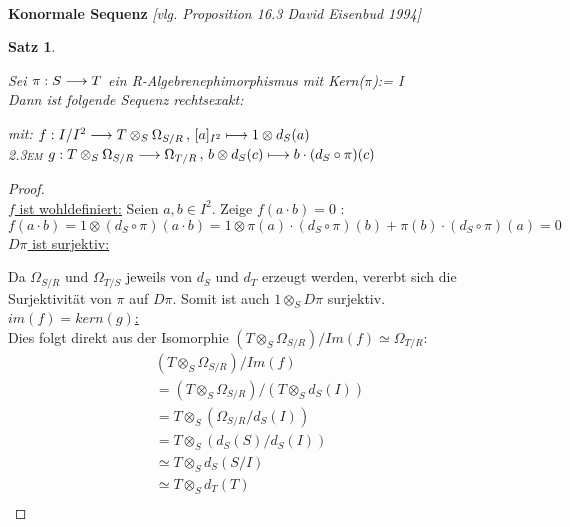 \documentclass[10pt,a4paper]{report}
\newcommand{\ModulsOfDifferenzials}{David Eisenbud 1994}
\newcounter{Aussage}[chapter]
\newtheorem{satz}[Aussage]{Satz}
\newcommand{\functionfront}[3]{\nolinebreak{#1:#2 \longrightarrow #3}}
\newcommand{\function}[5]{\nolinebreak{#1:#2 \longrightarrow #3 \, , \, #4 \longmapsto #5}}
\newcommand{\divR}[2]{\Omega_{#1/#2}}
\newcommand{\divf}[1]{d_{#1}}
\newcommand{\Tensor}[3]{#1 \otimes_{#2} #3}
\newcommand{\tensor}[3]{#1 \otimes #3}
\newcommand{\kernel}[1]{kern(#1)}
\newcommand{\immage}[1]{im(#1)}
\begin{document}
\ \\
\textbf{Konormale Sequenz} \textit{[vlg. Proposition 16.3 \ModulsOfDifferenzials]}
\begin{satz} \label{Konormale Sequenz}
\raggedright
Sei $\functionfront{\pi}{S}{T}$ ein R-Algebrenephimorphismus mit Kern($\pi$):= I \\
Dann ist folgende Sequenz rechtsexakt: \\
\begin{center}
\end{center}
\begin{spacing}{1.5}
mit: $\function{f}{I/I^2}{{\Tensor{T}{S}{\divR{S}{R}}}}{[a]_{I^2}}{\tensor{1}{S}{\divf{S}(a)}}$\\
\textsc{\leftskip2.3em} $\function{g}{\Tensor{T}{S}{\divR{S}{R}}}{\divR{T}{R}}{\tensor{b}{S}{\divf{S}(c)}}{b \cdot (\divf{S} \circ \pi)(c)}$
\end{spacing}
\end{satz}
\begin{proof} \ \\
\underline{$f$ ist wohldefiniert:} Seien $a,b\in I^2$. Zeige $f(a \cdot b)=0$ :
$$ f(a \cdot b) =
\tensor{1}{S}{( \divf{S} \circ \pi )(a \cdot b)} =
\tensor{1}{S}{\pi(a) \cdot (\divf{S} \circ \pi )(b) + \pi(b) \cdot ( \divf{S} \circ \pi )(a)} = 0$$
\underline{$D\pi$ ist surjektiv:}
\begin{center}
\end{center}
Da $\divR{S}{R}$ und $\divR{T}{S}$ jeweils von $\divf{S}$ und $\divf{T}$ erzeugt werden, vererbt sich die Surjektivität von $\pi$ auf $D\pi$. Somit ist auch $\Tensor{1}{S}{D\pi}$ surjektiv.\\
\underline{$\immage{f}=\kernel{g}$:}\\ Dies folgt direkt aus  der Isomorphie $(\Tensor{T}{S}{\divR{S}{R}})/Im(f) \simeq \divR{T}{R}$:
\begin{align*}
(\Tensor{T}{S}{\divR{S}{R}})/Im(f) \\
= (\Tensor{T}{S}{\divR{S}{R}})/(\Tensor{T}{S}{\divf{S}(I)}) \\
= \Tensor{T}{S}{(\divR{S}{R}/\divf{S}(I))} \\ 
= \Tensor{T}{S}{(\divf{S}(S)/ \divf{S}(I))} \\
\simeq \Tensor{T}{S}{\divf{S}(S/I)} \\
\simeq \Tensor{T}{S}{\divf{T}(T)} \\
\end{align*}
\end{proof}
\end{document}
